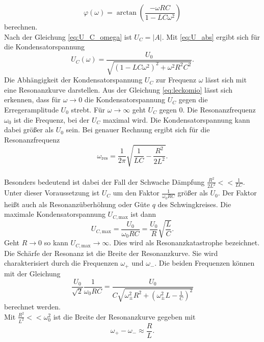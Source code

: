 \begin{equation}\label{eq:phi}
    φ(ω) = \arctan{\left(\frac{-ωRC}{1 - LCω^2}\right)}
\end{equation} berechnen.\\
Nach der Gleichung \eqref{eq:U_C_omega} ist $U_C = |A|.$ Mit \autoref{eq:U_abs} ergibt sich für die Kondensatorspannung
\begin{equation}\label{eq:leckomio}
    U_C(ω) = \frac{U_0}{\sqrt{\left(1 - LCω^2\right)^2 + ω^2R^2C^2}}.
\end{equation}
Die Abhängigkeit der Kondensatorspannung $U_C$ zur Frequenz $ω$ lässt sich mit eine Resonanzkurve darstellen.
Aus der Gleichung \eqref{eq:leckomio} lässt sich erkennen, dass für $ω \longrightarrow 0$ die Kondensatorspannung $U_C$ gegen die Erregeramplitude $U_0$ strebt.
Für $ω \longrightarrow \infty$ geht $U_C$ gegen $0.$
Die Resonanzfrequenz $ω_0$ ist die Frequenz, bei der $U_C$ maximal wird. Die Kondensatorspannung kann dabei größer als $U_0$ sein.
Bei genauer Rechnung ergibt sich für die Resonanzfrequenz
\begin{equation}\label{eq:wres}
    ω_{\text{res}} = \frac{1}{2π}\sqrt{\frac{1}{LC} - \frac{R^2}{2L^2}}.
\end{equation}\\
Besonders bedeutend ist dabei der Fall der Schwache Dämpfung $\frac{R^2}{2L^2} << \frac{1}{LC}.$\\
Unter dieser Voraussetzung ist $U_C$ um den Faktor $\frac{1}{ω_0RC}$ größer als $U_0.$ Der Faktor heißt auch als Resonanzüberhöhung oder Güte $q$ des Schwingkreises.
Die maximale Kondensatorspannung $U_{C,\text{max}}$ ist dann
\begin{equation*}
    U_{C,\text{max}} = \frac{U_0}{ω_0RC} = \frac{U_0}{R}\sqrt{\frac{L}{C}}.
\end{equation*}
Geht $R \longrightarrow 0$ so kann $U_{C,\text{max}} \longrightarrow \infty.$ Dies wird als Resonanzkatastrophe bezeichnet.\\
Die Schärfe der Resonanz ist die Breite der Resonanzkurve. Sie wird charakterisiert durch die Frequenzen $ω_+$ und $ω_-$.
Die beiden Frequenzen können mit der Gleichung
\begin{equation*}
    \frac{U_0}{\sqrt{2}} \frac{1}{ω_0RC} = \frac{U_0}{C\sqrt{ω_{\pm}^2R^2 + \left(ω_{\pm}^2L - \frac{1}{C}\right)^2}}
\end{equation*}
berechnet werden.\\
Mit $\frac{R^2}{L^2} << ω_0^2$ ist die Breite der Resonanzkurve gegeben mit
\begin{equation}\label{eq:gute}
    ω_+ - ω_- \approx \frac{R}{L}.
\end{equation}
